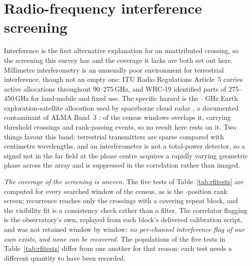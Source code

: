 \section{Radio-frequency interference screening}
\label{app:rfi}

Interference is the first alternative explanation for an unattributed
crossing, so the screening this survey has and the coverage it lacks are both
set out here. Millimetre interferometry is an unusually poor
environment for terrestrial interference, though not an empty one: ITU Radio
Regulations Article~5 \citep{ITU2024} carries active allocations throughout
90--275\,GHz, and WRC-19 identified parts of 275--450\,GHz for land-mobile and
fixed use. The specific hazard is the \RadarLo--\RadarHi\,GHz Earth
exploration-satellite allocation used by spaceborne cloud radar
\citep{CloudSat2002,EarthCARE2023}, a documented contaminant of ALMA Band~3
\citep{ALMAMemo504}: of the \RadarNTot{} census windows \RadarNWin{} overlaps
it, carrying \RadarNCross{} threshold crossings and \RadarNStage{}
rank-passing events, so no result here rests on it. Two things favour this
band: terrestrial transmitters are sparse compared with centimetre
wavelengths, and an interferometer is not a total-power detector, so a signal
not in the far field at the phase centre acquires a rapidly varying
geometric phase across the array and is suppressed in the correlation rather
than imaged.

\emph{The coverage of the screening is uneven.} The five tests of
Table~\ref{tab:rfitests} are computed for every searched window of the
census, as is the \NCtrl-position rank screen; recurrence
reaches only the crossings with a covering repeat block, and the visibility
fit is a consistency check rather than a filter. The correlator flagging is
the observatory's own, replayed from each block's delivered calibration
script, and was not retained window by window: \emph{no per-channel
interference flag of our own exists, and none can be recovered.} The
populations of the five tests in Table~\ref{tab:rfitests} differ from one
another for that reason: each test needs a different quantity to have been
recorded.

